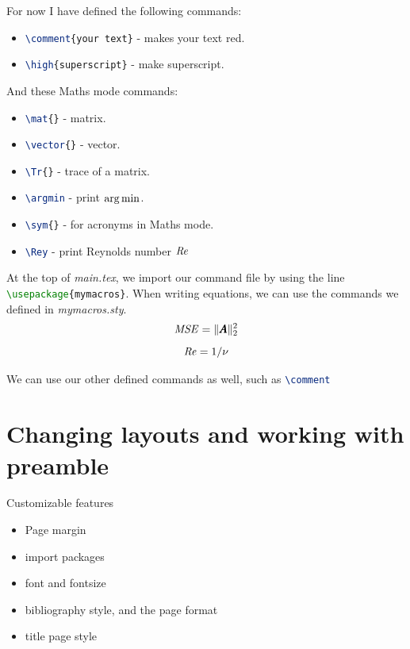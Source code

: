 For now I have defined the following commands:
\begin{itemize}
    \item \lstinline[language=tex]!\comment{your text}! - makes your text red.
    \item \lstinline[language=tex]!\high{superscript}! - make superscript.
\end{itemize}
And these Maths mode commands:
\begin{itemize}
    \item \lstinline[language=tex]!\mat{}! - matrix.
    \item \lstinline[language=tex]!\vector{}! - vector.
    \item \lstinline[language=tex]!\Tr{}! - trace of a matrix.
    \item \lstinline[language=tex]!\argmin! - print $\operatorname*{arg\,min}$.
    \item \lstinline[language=tex]!\sym{}! - for acronyms in Maths mode.  
    \item \lstinline[language=tex]!\Rey! - print Reynolds number $\mbox{\textit{Re}}$
\end{itemize}

At the top of \emph{main.tex}, we import our command file by using the line \lstinline[language=tex]!\usepackage{mymacros}!.
When writing equations, we can use the commands we defined in \emph{mymacros.sty}.
\begin{equation}
    \mbox{\textit{MSE}} = \| \pmb{A} \|^2_2
\end{equation}
\begin{equation*}
    \mbox{\textit{Re}} = 1/\nu
\end{equation*}

We can use our other defined commands as well, such as \lstinline[language=tex]!\comment! 


\section{Changing layouts and working with preamble}\label{sec:intro:layouts}
Customizable features 
\begin{itemize}
    \item Page margin
    \item import packages
    \item font and fontsize
    \item bibliography style, and the page format
    \item title page style
\end{itemize}
